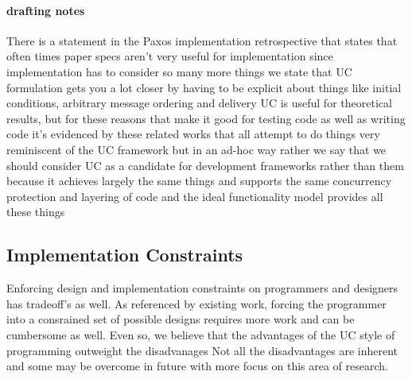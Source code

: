 

\paragraph{drafting notes}
There is a statement in the Paxos implementation retrospective that states that often times paper specs aren't very useful for implementation since implementation has to consider so many more things
we state that UC formulation gets you a lot closer by having to be explicit about things like initial conditions, arbitrary message ordering and delivery
UC is useful for theoretical results, but for these reasons that make it good for testing code as well as writing code
it's evidenced by these related works that all attempt to do things very reminiscent of the UC framework but in an ad-hoc way
rather we say that we should consider UC as a candidate for development frameworks rather than them because it achieves largely the same things and supports the same concurrency protection and layering of code and the ideal functionality model provides all these things


\subsection{Implementation Constraints}
Enforcing design and implementation constraints on programmers and designers has tradeoff's as well. 
As referenced by existing work, forcing the programmer into a consrained set of possible designs requires more work and can be cumbersome as well.
Even so, we believe that the advantages of the UC style of programming outweight the disadvanages
Not all the disadvantages are inherent and some may be overcome in future with more focus on this area of research. 



  
